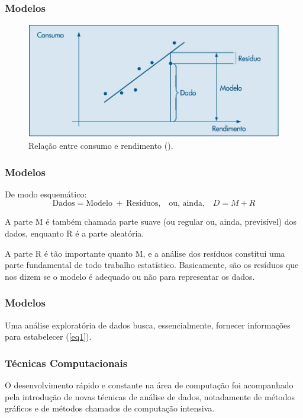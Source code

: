 \documentclass[14pt,aspectratio=1610]{beamer}
\begin{document}
\begin{frame}{}
\frametitle{Modelos}
\begin{figure}[H]
    \centering
    \includegraphics[scale=0.5]{Fig1}
    \caption{Relação entre consumo e rendimento (\cite{Morettin09}).}
    \label{fig_ex1}
  \end{figure}
\end{frame}

\begin{frame}{}
\frametitle{Modelos}
\begin{block}{}
\justifying
De modo esquemático:
\begin{equation}
\label{eq1}
\textrm{Dados}=\textrm{Modelo}\ +\ \textrm{Resíduos,}\quad \textrm{ou, ainda,}\quad 
D=M+R
\end{equation}
\end{block}
\pause
\begin{block}{}
\justifying
A parte M é também chamada parte suave (ou regular ou, ainda, previsível) dos dados, enquanto R é a parte aleatória. 
\end{block}
\pause
\begin{block}{}
\justifying
A parte R é tão importante quanto M, e a análise dos resíduos constitui uma parte fundamental de todo trabalho estatístico. Basicamente, são os resíduos que nos 
dizem se o modelo é adequado ou não para representar os dados.
\end{block}
\end{frame}

\begin{frame}{}
\frametitle{Modelos}
\begin{block}{}
\justifying
Uma análise exploratória de dados busca, essencialmente, fornecer informações
para estabelecer (\ref{eq1}).
\end{block}
\end{frame}

\begin{frame}{}
\frametitle{Técnicas Computacionais}
\begin{block}{}
\justifying
O desenvolvimento rápido e constante na área de computação foi acompanhado pela introdução de novas técnicas de análise de dados, notadamente de métodos 
gráficos e de métodos chamados de computação intensiva.
\end{block}
\end{frame}
\end{document}
